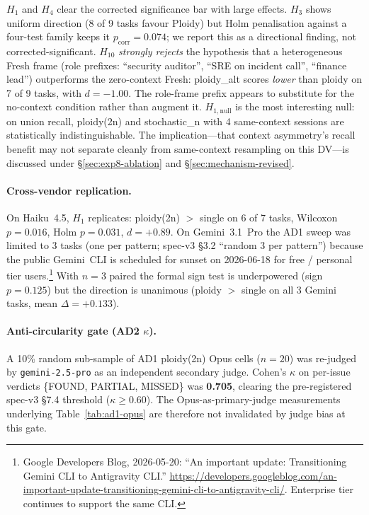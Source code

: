 \documentclass[11pt]{article}
\begin{document}
$H_1$ and $H_4$ clear the corrected significance bar with large
effects. $H_3$ shows uniform direction (8 of 9 tasks favour Ploidy)
but Holm penalisation against a four-test family keeps it
$p_\text{corr} = 0.074$; we report this as a directional finding,
not corrected-significant. $H_{10}$ \emph{strongly rejects} the
hypothesis that a heterogeneous Fresh frame (role prefixes:
``security auditor'', ``SRE on incident call'', ``finance lead'')
outperforms the zero-context Fresh: ploidy\_alt scores
\emph{lower} than ploidy on 7 of 9 tasks, with $d = -1.00$. The
role-frame prefix appears to substitute for the no-context
condition rather than augment it. $H_{1,\text{null}}$ is the most
interesting null: on union recall, ploidy(2n) and stochastic\_n
with 4 same-context sessions are statistically indistinguishable.
The implication---that context asymmetry's recall benefit may not
separate cleanly from same-context resampling on this DV---is
discussed under §\ref{sec:exp8-ablation} and §\ref{sec:mechanism-revised}.

\paragraph{Cross-vendor replication.} On Haiku~4.5, $H_1$ replicates:
ploidy(2n) $>$ single on 6 of 7 tasks, Wilcoxon $p = 0.016$,
Holm $p = 0.031$, $d = +0.89$. On Gemini~3.1~Pro the AD1 sweep was
limited to 3 tasks (one per pattern; spec-v3 §3.2 ``random 3 per
pattern'') because the public Gemini~CLI is scheduled for sunset
on 2026-06-18 for free / personal tier
users.\footnote{Google Developers Blog, 2026-05-20: ``An important
update: Transitioning Gemini CLI to Antigravity CLI.''
\url{https://developers.googleblog.com/an-important-update-transitioning-gemini-cli-to-antigravity-cli/}.
Enterprise tier continues to support the same CLI.} With $n=3$ paired
the formal sign test is underpowered (sign $p = 0.125$) but the
direction is unanimous (ploidy $>$ single on all 3 Gemini tasks,
mean $\Delta = +0.133$).

\paragraph{Anti-circularity gate (AD2 $\kappa$).} A 10\% random
sub-sample of AD1 ploidy(2n) Opus cells ($n=20$) was re-judged by
\texttt{gemini-2.5-pro} as an independent secondary judge. Cohen's
$\kappa$ on per-issue verdicts \{FOUND, PARTIAL, MISSED\} was
\textbf{0.705}, clearing the pre-registered spec-v3 §7.4 threshold
($\kappa \geq 0.60$). The Opus-as-primary-judge measurements
underlying Table~\ref{tab:ad1-opus} are therefore not invalidated
by judge bias at this gate.
\end{document}

